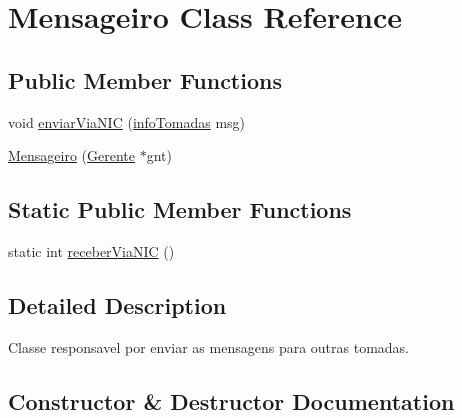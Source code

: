 \hypertarget{class_mensageiro}{}\section{Mensageiro Class Reference}
\label{class_mensageiro}
\subsection*{Public Member Functions}
\begin{DoxyCompactItemize}
\item 
void \hyperlink{class_mensageiro_a410ac197a7b420db01e11591d795adc3}{enviar\+Via\+N\+IC} (\hyperlink{structinfo_tomadas}{info\+Tomadas} msg)
\item 
\hyperlink{class_mensageiro_ae9334da69814ca1c68be1ee3e8598033}{Mensageiro} (\hyperlink{class_gerente}{Gerente} $\ast$gnt)
\end{DoxyCompactItemize}
\subsection*{Static Public Member Functions}
\begin{DoxyCompactItemize}
\item 
static int \hyperlink{class_mensageiro_a455af49f91502614d89193f5336b8ace}{receber\+Via\+N\+IC} ()
\end{DoxyCompactItemize}


\subsection{Detailed Description}
Classe responsavel por enviar as mensagens para outras tomadas. 

\subsection{Constructor \& Destructor Documentation}
